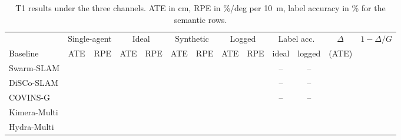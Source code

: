 \begin{table}[t]
\centering
\caption{T1 results under the three channels. ATE in cm, RPE in
\%/deg per \SI{10}{\metre}, label accuracy in \% for the semantic
rows.}
\label{tab:res_t1}
\footnotesize
\setlength{\tabcolsep}{4pt}
\begin{tabular}{@{}l cc cc cc cc cc c c@{}}
\toprule
& \multicolumn{2}{c}{Single-agent} & \multicolumn{2}{c}{Ideal} & \multicolumn{2}{c}{Synthetic} & \multicolumn{2}{c}{Logged} & \multicolumn{2}{c}{Label acc.} & $\Delta$ & $1-\Delta/G$ \\
\cmidrule(lr){2-3}\cmidrule(lr){4-5}\cmidrule(lr){6-7}\cmidrule(lr){8-9}\cmidrule(lr){10-11}
Baseline & ATE & RPE & ATE & RPE & ATE & RPE & ATE & RPE & ideal & logged & (ATE) & \\
\midrule
Swarm-SLAM   & \todo{} & \todo{} & \todo{} & \todo{} & \todo{} & \todo{} & \todo{} & \todo{} & -- & -- & \todo{} & \todo{} \\
DiSCo-SLAM   & \todo{} & \todo{} & \todo{} & \todo{} & \todo{} & \todo{} & \todo{} & \todo{} & -- & -- & \todo{} & \todo{} \\
COVINS-G     & \todo{} & \todo{} & \todo{} & \todo{} & \todo{} & \todo{} & \todo{} & \todo{} & -- & -- & \todo{} & \todo{} \\
Kimera-Multi & \todo{} & \todo{} & \todo{} & \todo{} & \todo{} & \todo{} & \todo{} & \todo{} & \todo{} & \todo{} & \todo{} & \todo{} \\
Hydra-Multi  & \todo{} & \todo{} & \todo{} & \todo{} & \todo{} & \todo{} & \todo{} & \todo{} & \todo{} & \todo{} & \todo{} & \todo{} \\
\bottomrule
\end{tabular}
\end{table}
